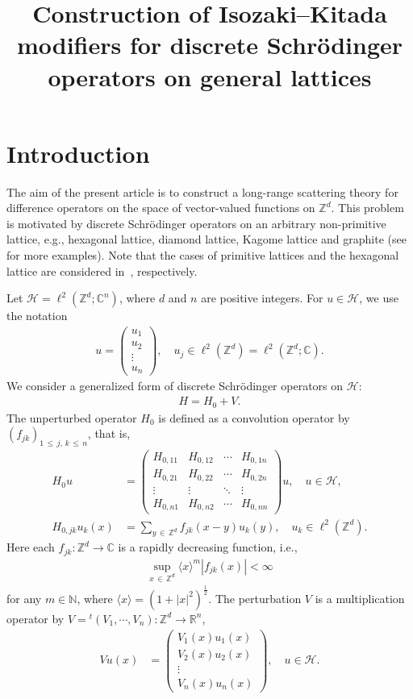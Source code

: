 \documentclass[AHL,Unicode,longabstracts,published]{cedram}
\title[Isozaki--Kitada modifiers on general lattices]{Construction of Isozaki--Kitada modifiers for discrete Schr\"odinger operators on general lattices}
\author[\initial{Y.} \lastname{Tadano}]{\firstname{Yukihide} \lastname{Tadano}}
\newcommand{\Schr}{Schr\"odinger }
\newcommand{\C}{\mathbb{C}}
\newcommand{\R}{\mathbb{R}}
\newcommand{\Z}{\mathbb{Z}}
\newcommand{\bbN}{\mathbb{N}}
\newcommand{\HS}{\mathcal{H}}
\newcommand{\la}{\langle}
\newcommand{\ra}{\rangle}
\newcommand{\Z}{\mathbb{Z}}
\newcommand{\R}{\mathbb{R}}
\newcommand{\HS}{\mathcal{H}}
\begin{document}
\maketitle

\section{Introduction}

The aim of the present article is to construct a long-range scattering theory for difference operators on the space of vector-valued functions on $\Z^d$. This problem is motivated by discrete Schr\"odinger operators on an arbitrary non-primitive lattice, e.g., hexagonal lattice, diamond lattice, Kagome lattice and graphite (see~\cite{An-I-M} for more examples). Note that the cases of primitive lattices and the hexagonal lattice are considered in~\cite{T1,T2}, respectively.

Let $\HS=\ell^2(\Z^d; \C^n)$, where $d$ and $n$ are positive integers. For $u \in \HS$, we use the notation
\begin{align*}
u=
\begin{pmatrix}
u_1 \\ u_2 \\ \vdots \\ u_n
\end{pmatrix}
, \quad u_j \in \ell^2\left(\Z^d\right)=\ell^2\left(\Z^d;\C\right).
\end{align*}
We consider a generalized form of discrete \Schr operators on $\HS$:
\begin{align*}
H=H_0+V.
\end{align*}
The unperturbed operator $H_0$ is defined as a convolution operator by $(f_{jk})_{1\,\leq\,j,\,k\,\leq\,n}$, that is,
\begin{align*}
H_0u &= 
\begin{pmatrix}
H_{0,11} & H_{0,12} & \cdots & H_{0,1n} \\
H_{0,21} & H_{0,22} & \cdots & H_{0,2n} \\
\vdots & \vdots & \ddots & \vdots \\
H_{0,n1} & H_{0,n2} & \cdots & H_{0,nn}
\end{pmatrix}
u, \quad u \in \HS, \\
H_{0,jk}u_k(x) &=\sum_{y\,\in\,\Z^d}f_{jk}(x-y)u_k(y), \quad u_k \in \ell^2\left(\Z^d\right).
\end{align*}
Here each $f_{jk}: \Z^d \rightarrow \C$ is a rapidly decreasing function, i.e.,
\begin{align*}
\sup_{x\,\in\,\Z^d} \la x \ra^m \left|f_{jk}(x)\right| <\infty
\end{align*}
for any $m\in\bbN$, where $\la x \ra = (1+|x|^2)^{\frac{1}{2}}$. The perturbation $V$ is a multiplication operator by $V={}^t(V_1,\cdots,V_n):\Z^d \to \R^n$,
\begin{align*}
Vu(x) &= 
\begin{pmatrix}
V_1(x) u_1(x) \\ V_2(x) u_2(x) \\ \vdots \\ V_n(x) u_n(x)
\end{pmatrix}
, \quad u \in \HS.
\end{align*}
\end{document}
